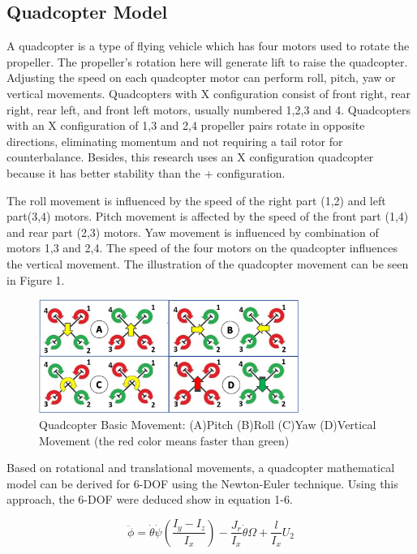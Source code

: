 \documentclass[a4paper]{jpconf}
\begin{document}
\subsection{Quadcopter Model}
A quadcopter is a type of flying vehicle which has four motors used to rotate the propeller. The propeller's rotation here will generate lift to raise the quadcopter. Adjusting the speed on each quadcopter motor can perform roll, pitch, yaw or vertical movements. Quadcopters with X configuration consist of front right, rear right, rear left, and front left motors, usually numbered 1,2,3 and 4. Quadcopters with an X configuration of 1,3 and 2,4 propeller pairs rotate in opposite directions, eliminating momentum and not requiring a tail rotor for counterbalance. Besides, this research uses an X configuration quadcopter because it has better stability than the + configuration.

The roll movement is influenced by the speed of the right part (1,2) and left part(3,4) motors. Pitch movement is affected by the speed of the front part (1,4) and rear part (2,3) motors. Yaw movement is influenced by combination of motors 1,3 and 2,4. The speed of the four motors on the quadcopter influences the vertical movement. The illustration of the quadcopter movement can be seen in Figure 1.

\begin{figure}[h]
    \centering
    \includegraphics[width=20pc]{quadcopter-basic-movement.png}
    \caption{\label{label}Quadcopter Basic Movement: (A)Pitch (B)Roll (C)Yaw (D)Vertical Movement (the red color means faster than green)}
\end{figure}

Based on rotational and translational movements, a quadcopter mathematical model can be derived for 6-DOF using the Newton-Euler technique. Using this approach, the 6-DOF were deduced show in equation 1-6.

\begin{equation}
    \ddot{\phi}=\dot{\theta}\dot{\psi}\left ( \frac{I_{y}-I_{z}}{I_{x}} \right )-\frac{J_{r}}{I_{x}}\dot{\theta}\Omega+\frac{l}{I_{x}}U_{2}
\end{equation}
\end{document}
